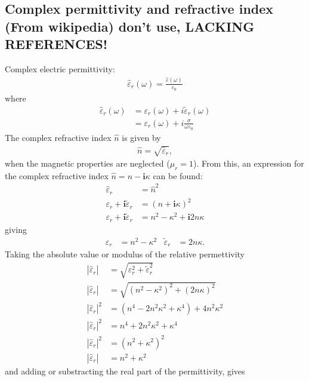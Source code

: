 \subsection{Complex permittivity and refractive index (From wikipedia) don't use, LACKING REFERENCES!}
Complex electric permittivity:
\begin{align}
   \hat{\varepsilon}_r(\omega) = \frac{\hat{\varepsilon} (\omega)}{\varepsilon_0}
\end{align}
where 
\begin{align}
   \hat{\varepsilon}_r(\omega) &= \varepsilon_r (\omega) + i\tilde{\varepsilon}_r (\omega) \\
                               &= \varepsilon_r (\omega) + i\frac{\sigma}{\omega\varepsilon_0} 
\end{align}
The complex refractive index $\hat{n}$ is given by 
\begin{align}
   \hat{n} = \sqrt{\hat{\varepsilon}_r},
\end{align}
when the magnetic properties are neglected ($\mu_r = 1$). 
From this, an expression for the complex refractive index $\hat{n} = n - \boldsymbol{i}\kappa$ can be found:
\begin{align}
   \hat{\varepsilon}_r &= \hat{n}^2 \\
   \varepsilon_r + \boldsymbol{i}\tilde{\varepsilon}_r &= (n + \boldsymbol{i} \kappa)^2 \\
   \varepsilon_r + \boldsymbol{i}\tilde{\varepsilon}_r &= n^2 - \kappa^2 + \boldsymbol{i}2n\kappa
\end{align}
giving
\begin{align}
   \varepsilon_r &= n^2 - \kappa^2     &\tilde{\varepsilon}_r  &= 2n\kappa.
\end{align}
Taking the absolute value or modulus of the relative permettivity
\begin{align}
   |\hat{\varepsilon}_r| &= \sqrt{ \varepsilon_r^2 + \tilde{\varepsilon}_r^2} \\
   |\hat{\varepsilon}_r| &= \sqrt{ (n^2 - \kappa^2)^2 + (2n\kappa)^2} \\
   |\hat{\varepsilon}_r|^2 &= (n^4 - 2n^2\kappa^2 + \kappa^4) + 4n^2\kappa^2 \\
   |\hat{\varepsilon}_r|^2 &= n^4 + 2n^2\kappa^2 + \kappa^4 \\
   |\hat{\varepsilon}_r|^2 &= (n^2 + \kappa^2)^2 \\
   |\hat{\varepsilon}_r| &= n^2 + \kappa^2 
\end{align}
and adding or substracting the real part of the permittivity, gives
